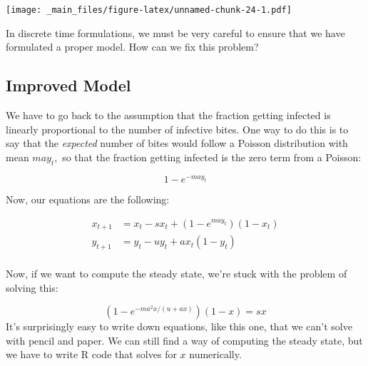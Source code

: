 \documentclass[
]{book}
\begin{document}
\texttt{[image: \_main\_files/figure-latex/unnamed-chunk-24-1.pdf]}

In discrete time formulations, we must be very careful to ensure that we have formulated a proper model. How can we fix this problem?

\subsection{Improved Model}\label{improved-model}

We have to go back to the assumption that the fraction getting infected is linearly proportional to the number of infective bites. One way to do this is to say that the \emph{expected} number of bites would follow a Poisson distribution with mean \(may_t,\) so that the fraction getting infected is the zero term from a Poisson:

\[1 - e^{-m a y_t}\]

Now, our equations are the following:

\[\begin{array}{rl}
x_{t+1} &=  x_t - s x_t + (1-e^{m a y_t}) (1-x_t)  \\ 
y_{t+1} &=  y_t - u y_t + a x_t (1 - y_t) \\ 
\end{array}\]

Now, if we want to compute the steady state, we're stuck with the problem of solving this:

\[(1-e^{-m a^2 x/(u + a x)}) (1-x) = sx\]
It's surprisingly easy to write down equations, like this one, that we can't solve with pencil and paper. We can still find a way of computing the steady state, but we have to write R code that solves for \(x\) numerically.
\end{document}
